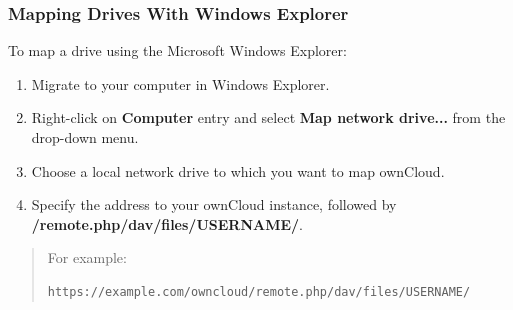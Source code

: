\documentclass[letterpaper,10pt,english]{sphinxmanual}
\begin{document}
\subsubsection{Mapping Drives With Windows Explorer}
\label{files/access_webdav:mapping-drives-with-windows-explorer}
To map a drive using the Microsoft Windows Explorer:
\begin{enumerate}
\item {} 
Migrate to your computer in Windows Explorer.

\item {} 
Right-click on \textbf{Computer} entry and select \textbf{Map network drive...} from
the drop-down menu.

\item {} 
Choose a local network drive to which you want to map ownCloud.

\item {} 
Specify the address to your ownCloud instance, followed by
\textbf{/remote.php/dav/files/USERNAME/}.

\end{enumerate}
\begin{quote}

For example:

\begin{Verbatim}[commandchars=\\\{\}]
https://example.com/owncloud/remote.php/dav/files/USERNAME/
\end{Verbatim}
\end{quote}
\end{document}

